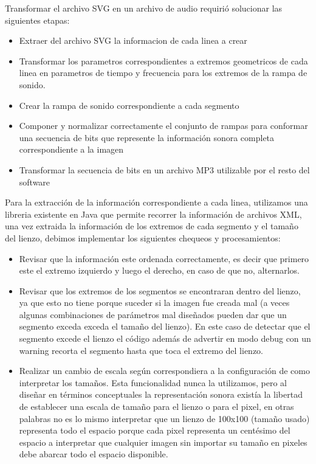 \documentclass{article}
\begin{document}
    Transformar el archivo SVG en un archivo de audio requirió solucionar las siguientes etapas:
    
    \begin{itemize}
        \item Extraer del archivo SVG la informacion de cada linea a crear
        \item Transformar los parametros correspondientes a extremos geometricos de cada linea en parametros de tiempo y frecuencia para los extremos de la rampa de sonido.
        \item Crear la rampa de sonido correspondiente a cada segmento
        \item Componer y normalizar correctamente el conjunto de rampas para conformar una secuencia de bits que represente la información sonora completa correspondiente a la imagen
        \item Transformar la secuencia de bits en un archivo MP3 utilizable por el resto del software
    \end{itemize}
    
    Para la extracción de la información correspondiente a cada linea, utilizamos una libreria existente en Java que permite recorrer la información de archivos XML, una vez extraida la información de los extremos de cada segmento y el tamaño del lienzo, debimos implementar los siguientes chequeos y procesamientos:
    
    \begin{itemize}
        \item Revisar que la información este ordenada correctamente, es decir que primero este el extremo izquierdo y luego el derecho, en caso de que no, alternarlos. 
        \item Revisar que los extremos de los segmentos se encontraran dentro del lienzo, ya que esto no tiene porque suceder si la imagen fue creada mal (a veces algunas combinaciones de parámetros mal diseñados pueden dar que un segmento exceda exceda el tamaño del lienzo). En este caso de detectar que el segmento excede el lienzo el código además de advertir en modo debug con un warning recorta el segmento hasta que toca el extremo del lienzo.
        \item Realizar un cambio de escala según correspondiera a la configuración de como interpretar los tamaños. Esta funcionalidad nunca la utilizamos, pero al diseñar en términos conceptuales la representación sonora existía la libertad de establecer una escala de tamaño para el lienzo o para el pixel, en otras palabras no es lo mismo interpretar que un lienzo de 100x100 (tamaño usado) representa todo el espacio porque cada pixel representa un centésimo del espacio a interpretar que cualquier imagen sin importar su tamaño en pixeles debe abarcar todo el espacio disponible. 
    \end{itemize}
    
\end{document}
